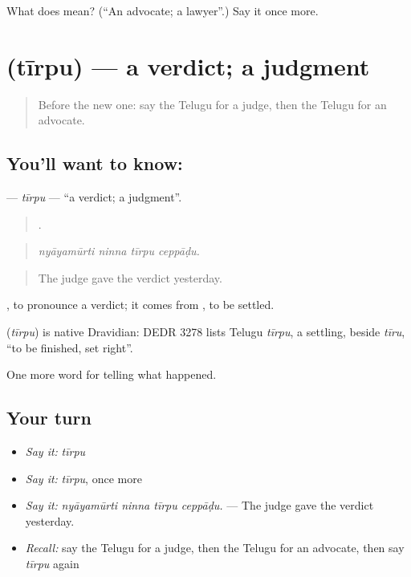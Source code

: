 \begin{tcolorbox}[breakable,colback=teal!4,colframe=teal!35!black,title={Before you move on}]
What does  mean? (\textquotedblleft{}An advocate; a lawyer\textquotedblright{}.) Say it once more.
\end{tcolorbox}
\section[\texorpdfstring{\te{తీర్పు} (tīrpu)}{తీర్పు (tīrpu)}]{ (tīrpu) — a verdict; a judgment}

\label{lesson:TE-C349-tirpu}



\begin{quote}
Before the new one: say the Telugu for a judge, then the Telugu for an advocate.
\end{quote}

\subsection*{You'll want to know: }
\textbf{} — \emph{tīrpu} — \textquotedblleft{}a verdict; a judgment\textquotedblright{}.

\begin{quote}
   .
\end{quote}

\begin{quote}
\emph{nyāyamūrti ninna tīrpu ceppāḍu.}
\end{quote}

\begin{quote}
The judge gave the verdict yesterday.
\end{quote}

 , to pronounce a verdict; it comes from , to be settled.

\begin{cousinweb}
\textbf{} (\emph{tīrpu}) is native Dravidian: DEDR 3278 lists Telugu \emph{tīrpu}, a settling, beside \emph{tīru}, \textquotedblleft{}to be finished, set right\textquotedblright{}.
\end{cousinweb}

\begin{grammarlens}[title={What you've built}]
One more word for telling what happened.
\end{grammarlens}

\subsection*{Your turn}
\begin{itemize}
\raggedright
  \item \emph{Say it:} \emph{tīrpu}
  \item \emph{Say it:} \emph{tīrpu}, once more
  \item \emph{Say it:} \emph{nyāyamūrti ninna tīrpu ceppāḍu.} — The judge gave the verdict yesterday.
  \item \emph{Recall:} say the Telugu for a judge, then the Telugu for an advocate, then say \emph{tīrpu} again
\end{itemize}

